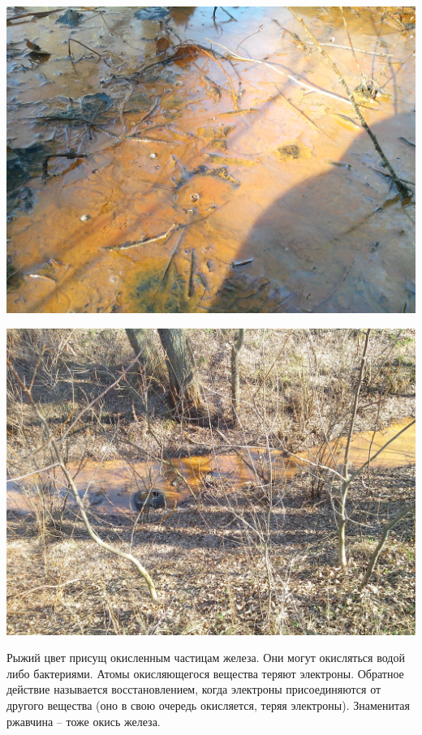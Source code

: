 \newpage
\vspace*{\fill}
\begin{center}
\includegraphics[width=\linewidth]{chast-gorodki/rud/IMG_20160316_145454.jpg}
\end{center}

\begin{center}
\includegraphics[width=\linewidth]{chast-gorodki/rud/IMG_20160316_145834.jpg}
\end{center}
\vspace*{\fill}
\newpage

Рыжий цвет присущ окисленным частицам железа. Они могут окисляться водой либо бактериями. Атомы окисляющегося вещества теряют электроны. Обратное действие называется восстановлением, когда электроны присоединяются от другого вещества (оно в свою очередь окисляется, теряя электроны). Знаменитая ржавчина – тоже окись железа.

